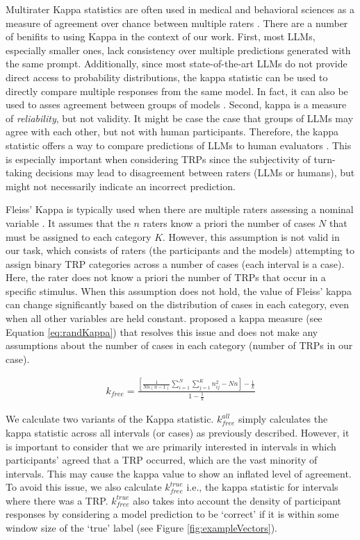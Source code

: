 Multirater Kappa statistics are often used in medical and behavioral sciences as a measure of agreement over chance between multiple raters \cite{artstein2008inter}. There are a number of benifits to using Kappa in the context of our work. First, most LLMs, especially smaller ones, lack consistency over multiple predictions generated with the same prompt. Additionally, since most state-of-the-art LLMs do not provide direct access to probability distributions, the kappa statistic can be used to directly compare multiple responses from the same model. In fact, it can also be used to asses agreement between groups of models \cite{tang2024tofueval}. Second, kappa is a measure of \emph{reliability}, but not validity. It might be case the case that groups of LLMs may agree with each other, but not with human participants. Therefore, the kappa statistic offers a way to compare predictions of LLMs to human evaluators \cite{wang2024prompt}. This is especially important when considering TRPs since the subjectivity of turn-taking decisions may lead to disagreement between raters (LLMs or humans), but might not necessarily indicate an incorrect prediction.

Fleiss' Kappa is typically used when there are multiple raters assessing a nominal variable \cite{fleiss1971measuring}. It assumes that the $n$ raters know a priori the number of cases $N$ that must be assigned to each category $K$. However, this assumption is not valid in our task, which consists of raters (the participants and the models) attempting to assign binary TRP categories across a number of cases (each interval is a case). Here, the rater does not know a priori the number of TRPs that occur in a specific stimulus. When this assumption does not hold, the value of Fleiss' kappa can change significantly based on the distribution of cases in each category, even when all other variables are held constant. \citet{randolph2005free} proposed a kappa measure (see Equation \ref{eq:randKappa}) that resolves this issue and does not make any assumptions about the number of cases in each category (number of TRPs in our case).

\begin{align}
    \label{eq:randKappa}
    k_{free} = \frac{[\frac{1}{Nn(n-1)} \sum_{i=1}^{N}\sum_{j=1}^{K} n_{ij}^2 - Nn] - \frac{1}{k}}{1 - \frac{1}{k}}
\end{align}


We calculate two variants of the Kappa statistic. $k_{free}^{all}$ simply calculates the kappa statistic across all intervals (or cases) as previously described. However, it is important to consider that we are primarily interested in intervals in which participants' agreed that a TRP occurred, which are the vast minority of intervals. This may cause the kappa value to show an inflated level of agreement. To avoid this issue, we also calculate $k_{free}^{true}$  i.e., the kappa statistic for intervals where there was a TRP. $k_{free}^{true}$ also takes into account the density of participant responses by considering a model prediction to be `correct' if it is within some window size of the `true' label (see Figure \ref{fig:exampleVectors}).


